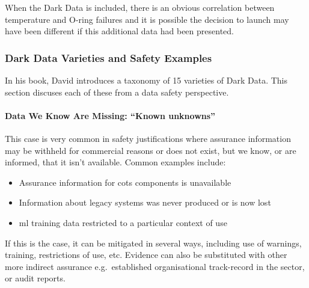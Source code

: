 When the Dark Data is included, there is an obvious correlation between temperature and O-ring failures and it is possible the decision to launch may have been different if this additional data had been presented.

\subsubsection{Dark Data Varieties and Safety Examples}
In his book, David introduces a taxonomy of 15 varieties of Dark Data. This section discuses each of these from a data safety perspective.

\paragraph{Data We Know Are Missing: ``Known unknowns''}\label{bkm:dark1}

This case is very common in safety justifications where assurance information may be withheld for commercial reasons or does not exist, but we know, or are informed, that it isn’t available. Common examples include:
\begin{itemize}
  \item Assurance information for \gls{cots} components is unavailable
  \item Information about legacy systems was never produced or is now lost
  \item \Gls{ml} training data restricted to a particular context of use
\end{itemize}
    If this is the case, it can be mitigated in several ways, including use of warnings, training, restrictions of use, etc. Evidence can also be substituted with other more indirect assurance e.g.\ established organisational track-record in the sector, or audit reports.
    
